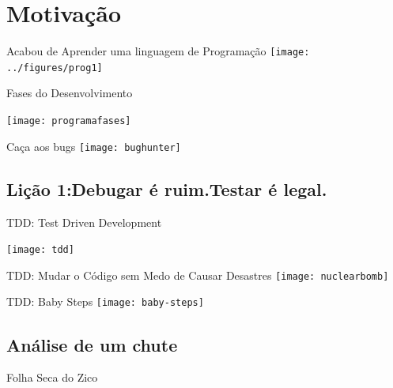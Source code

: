\section{Motivação}
\begin{frame}{Acabou de Aprender uma linguagem de Programação}
	\nocanto\texttt{[image: ../figures/prog1]}
\end{frame}

\begin{frame}{Fases do Desenvolvimento}
	\nocanto\vspace{-0.5cm}
	\begin{center}
		\texttt{[image: programafases]}
	\end{center}
\end{frame}

\begin{frame}{Caça aos bugs}
	\nocanto\texttt{[image: bughunter]}
\end{frame}

\subsection{Lição 1:\break Debugar é ruim.\break Testar é legal.}
\begin{frame}{TDD: Test Driven Development}
	\nocanto\vspace{-0.5cm}\begin{center}
		\texttt{[image: tdd]}
	\end{center}
\end{frame}

\begin{frame}{TDD: Mudar o Código sem Medo de Causar Desastres}
	\nocanto\texttt{[image: nuclearbomb]}
\end{frame}

\begin{frame}{TDD: Baby Steps}
	\nocanto\texttt{[image: baby-steps]}
\end{frame}

\subsection{Análise de um chute}
\begin{frame}{Folha Seca do Zico}
	\begin{center}
	\end{center}
\end{frame}

